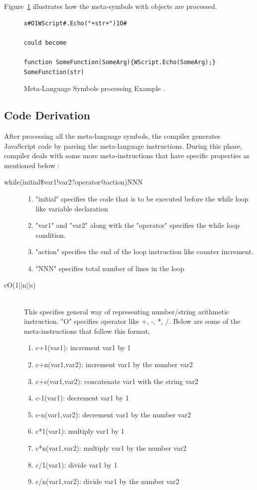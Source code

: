 Figure~\ref{fig:metalanguageprocessing} illustrates how the meta-symbols with objects are processed.

\begin{figure}
  \centering
  \begin{lstlisting}[language=myasm,numbers=none]
x#O1WScript#.Echo(°+str+°)1O# 

could become

function SomeFunction(SomeArg){WScript.Echo(SomeArg);}
SomeFunction(str)
\end{lstlisting}
    \caption[Meta-Language Symbols processing Example]{Meta-Language Symbols processing Example \cite{bib26}.}
    \label{fig:metalanguageprocessing}
\end{figure}

\subsection{Code Derivation}
After processing all the meta-language symbols, the compiler generates JavaScript code by parsing the meta-language instructions. During this phase, compiler deals with some more meta-instructions that have specific properties as mentioned below \cite{bib26}:
\begin{description}
\item[while(initial\$var1!var2?operator@action)NNN]\hfill 
\begin{enumerate}
\item "initial" specifies the code that is to be executed before the while loop like variable declaration
\item "var1" and "var2" along with the "operator" specifies the while loop condition.
\item "action" specifies the end of the loop instruction like counter increment.
\item "NNN" specifies total number of lines in the loop
\end{enumerate}

\item[cO(1||n||s)] \hfill \\
This specifies general way of representing number/string arithmetic instruction. "O" specifies operator like +, -, *, /. Below are some of the meta-instructions that follow this format,
\begin{enumerate}
\item c+1(var1): increment var1 by 1
\item c+n(var1,var2): increment var1 by the number var2
\item c+s(var1,var2): concatenate var1 with the string var2
\item c-1(var1): decrement var1 by 1
\item c-n(var1,var2): decrement var1 by the number var2
\item c*1(var1): multiply var1 by 1
\item c*n(var1,var2): multiply var1 by the number var2
\item c/1(var1): divide var1 by 1
\item c/n(var1,var2): divide var1 by the number var2 
  \end{enumerate}
\end{description}

